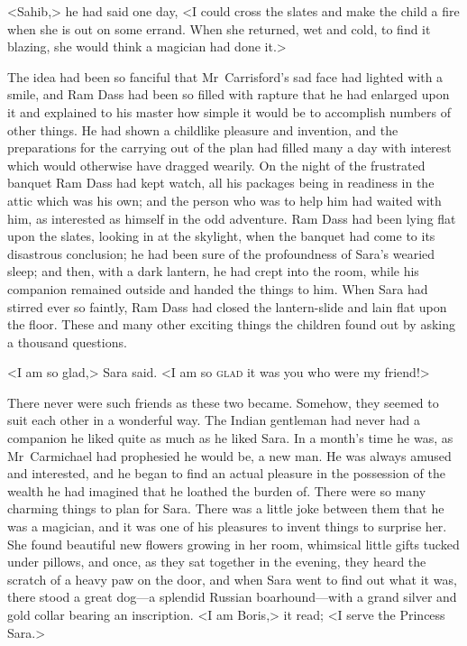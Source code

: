 <Sahib,> he had said one day, <I could cross the slates and make the child a fire when she is out on some errand. When she returned, wet and cold, to find it blazing, she would think a magician had done it.>

The idea had been so fanciful that Mr~Carrisford's sad face had lighted with a smile, and Ram Dass had been so filled with rapture that he had enlarged upon it and explained to his master how simple it would be to accomplish numbers of other things. He had shown a childlike pleasure and invention, and the preparations for the carrying out of the plan had filled many a day with interest which would otherwise have dragged wearily. On the night of the frustrated banquet Ram Dass had kept watch, all his packages being in readiness in the attic which was his own; and the person who was to help him had waited with him, as interested as himself in the odd adventure. Ram Dass had been lying flat upon the slates, looking in at the skylight, when the banquet had come to its disastrous conclusion; he had been sure of the profoundness of Sara's wearied sleep; and then, with a dark lantern, he had crept into the room, while his companion remained outside and handed the things to him. When Sara had stirred ever so faintly, Ram Dass had closed the lantern-slide and lain flat upon the floor. These and many other exciting things the children found out by asking a thousand questions.

<I am so glad,> Sara said. <I am so \textsc{glad} it was you who were my friend!>

There never were such friends as these two became. Somehow, they seemed to suit each other in a wonderful way. The Indian gentleman had never had a companion he liked quite as much as he liked Sara. In a month's time he was, as Mr~Carmichael had prophesied he would be, a new man. He was always amused and interested, and he began to find an actual pleasure in the possession of the wealth he had imagined that he loathed the burden of. There were so many charming things to plan for Sara. There was a little joke between them that he was a magician, and it was one of his pleasures to invent things to surprise her. She found beautiful new flowers growing in her room, whimsical little gifts tucked under pillows, and once, as they sat together in the evening, they heard the scratch of a heavy paw on the door, and when Sara went to find out what it was, there stood a great dog—a splendid Russian boarhound—with a grand silver and gold collar bearing an inscription. <I am Boris,> it read; <I serve the Princess Sara.>

